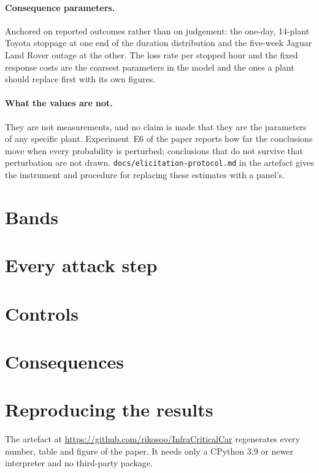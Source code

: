 \documentclass[10pt,a4paper]{article}
\newcommand{\capmrepo}{https://github.com/rikosoo/InfraCriticalCar}
\begin{document}
\paragraph{Consequence parameters.} Anchored on reported outcomes rather than on
judgement: the one-day, 14-plant Toyota stoppage at one end of the duration
distribution and the five-week Jaguar Land Rover outage at the other. The loss
rate per stopped hour and the fixed response costs are the coarsest parameters
in the model and the ones a plant should replace first with its own figures.

\paragraph{What the values are not.} They are not measurements, and no claim is
made that they are the parameters of any specific plant. Experiment~E6 of the
paper reports how far the conclusions move when every probability is perturbed;
conclusions that do not survive that perturbation are not drawn.
\texttt{docs/elicitation-protocol.md} in the artefact gives the instrument and
procedure for replacing these estimates with a panel's.

\section{Bands}


\section{Every attack step}


\section{Controls}


\section{Consequences}


\section{Reproducing the results}

The artefact at \url{\capmrepo} regenerates every number, table and figure of
the paper. It needs only a CPython 3.9 or newer interpreter and no third-party
package.
\end{document}
